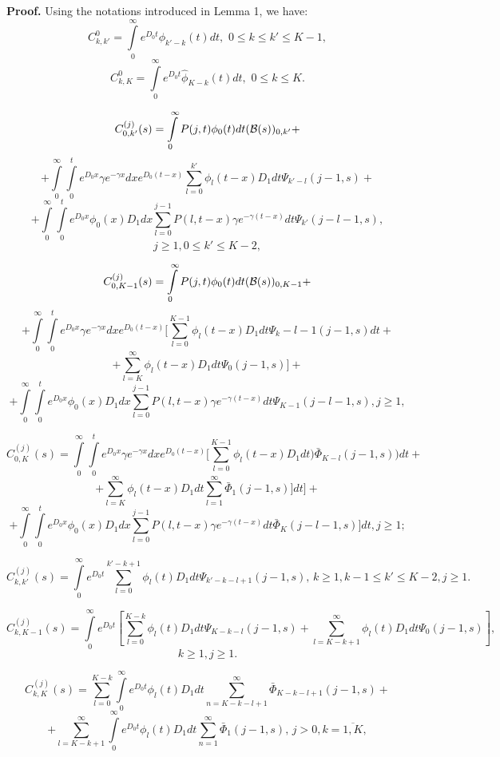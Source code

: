 \documentclass[12pt, a4paper]{article}
\begin{document}
{\bf Proof.}
Using the notations introduced in Lemma 1, we have:
$$
C_{k,k'}^0=\int\limits_0^\infty e^{D_0t}\phi_{k'-k}(t)dt, \,\,0\leq k\leq k'\leq K-1,
$$
$$
C_{k,K}^0=\int\limits_0^\infty e^{D_0t}\hat{\phi}_{K-k}(t)dt, \,\,0\leq k\leq K.
$$


$$ C_{0,k'}^{(j)}(s)=\int\limits_0^\infty  P(j,t)\phi_0(t)dt ({\cal B}(s))_{0,k'}+
$$
$$
+\int\limits_0^\infty \int\limits_0^t e^{D_0x}\gamma e^{-\gamma x}dx
e^{D_0(t-x)}\sum\limits_{l=0}^{k'}{\phi}_l(t-x)D_1dt \Psi_{k'-l}(j-1,s)+
$$
$$
+\int\limits_0^\infty \int\limits_0^t e^{D_0x}\phi_0(x)D_1dx \sum\limits_{l=0}^{j-1}P(l,t-x)\gamma e^{-\gamma (t-x)}dt
\Psi_{k'}(j-l-1, s),
$$
$$
j\geq1, 0\leq k'\leq K-2,
$$


$$
 C_{0,K-1}^{(j)}(s)=\int\limits_0^\infty  P(j,t)\phi_0(t)dt ({\cal B}(s))_{0,K-1}+
 $$
 $$+
  \int\limits_0^\infty \int\limits_0^t e^{D_0x}\gamma e^{-\gamma x}dx
e^{D_0(t-x)}
[\sum\limits_{l=0}^{K-1}{\phi}_l(t-x)D_1dt  \Psi_k-l-1(j-1,s)dt+
$$
$$
+\sum\limits_{l=K}^\infty{\phi}_l(t-x)D_1dt \Psi_0(j-1,s)]+
$$
$$
+\int\limits_0^\infty \int\limits_0^t e^{D_0x}\phi_0(x)D_1dx \sum\limits_{l=0}^{j-1}P(l,t-x)\gamma e^{-\gamma (t-x)}dt
\Psi_{K-1}(j-l-1,s),
 j\geq1,
$$


$$
 C_{0,K}^{(j)}(s)=\int\limits_0^\infty \int\limits_0^t e^{D_0x}\gamma e^{-\gamma x}dx
e^{D_0(t-x)}[\sum\limits_{l=0}^{K-1}{\phi}_l(t-x)D_1dt
){\bar\Phi}_{K-l}(j-1,s))dt
+
$$
$$
+\sum\limits_{l=K}^{\infty}{\phi}_l(t-x)D_1dt
 \sum\limits_{l=1}^{\infty} {\bar\Phi}_1(j-1,s)]dt]+
$$
$$
+\int\limits_0^\infty \int\limits_0^t e^{D_0x}\phi_0(x)D_1dx \sum\limits_{l=0}^{j-1}P(l,t-x)\gamma e^{-\gamma (t-x)}dt
{\bar\Phi}_K(j-l-1, s)]dt,
 j\geq 1;
$$

$$
 C_{k,k'}^{(j)}(s)=
\int\limits_0^\infty e^{D_0t}\sum\limits_{l=0}^{k'-k+1}{\phi}_l(t)D_1dt \Psi_{k'-k-l+1}(j-1, s),\,
 k\geq1, k-1\leq k'\leq K-2, j\geq1.
$$

$$
 C_{k,K-1}^{(j)}(s)=
\int\limits_0^\infty e^{D_0t}[\sum\limits_{l=0}^{K-k}{\phi}_l(t)D_1dt
\Psi_{K-k-l}(j-1,s)+
\sum\limits_{l=K-k+1}^\infty{\phi}_l(t)D_1dt \Psi_0(j-1,s)],
$$
$$
 k\geq1,  j\geq1.
$$



$$
C_{k,K}^{(j)}(s)=\sum\limits_{l=0}^{K-k}
\int\limits_0^\infty e^{D_0t}{\phi}_l(t)D_1dt \sum\limits_{n=K-k-l+1}^\infty {\bar \Phi}_{K-k-l+1}(j-1, s)+
$$
$$
+\sum\limits_{l=K-k+1}^\infty
\int\limits_0^\infty e^{D_0t}{\phi}_l(t)D_1dt
 \sum\limits_{n=1}^\infty {\bar \Phi}_1(j-1,s), \,
j>0, k=\overline{1, K},
$$
\end{document}
